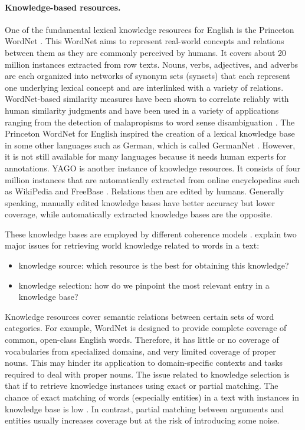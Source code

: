 \paragraph{Knowledge-based resources.}
One of the fundamental lexical knowledge resources for English is the Princeton WordNet \cite{fellbaum98}.  
This WordNet aims to represent real-world concepts and relations between them as they are commonly perceived by humans. 
It covers about 20 million instances extracted from row texts. 
Nouns, verbs, adjectives, and adverbs are each organized into networks of synonym sets (synsets) that each represent one underlying lexical concept and are interlinked with a variety of relations. 
WordNet-based similarity measures have been shown to correlate reliably with human similarity judgments and have been used in a variety of applications ranging from the detection of malapropisms to word sense disambiguation \cite{budanitsky06}.  
The Princeton WordNet for English inspired the creation of a lexical knowledge base in some other languages such as German, which is called GermanNet \cite{hamp97}. 
However, it is not still available for many languages because it needs human experts for annotations.  
YAGO \cite{hoffart13} is another instance of knowledge resources.  
It consists of four million instances that are automatically extracted from online encyclopedias such as WikiPedia \cite{denoyer06} and FreeBase \cite{bollacker08}. 
Relations then are edited by humans. 
Generally speaking, manually edited knowledge bases have better accuracy but lower coverage, while automatically extracted knowledge bases are the opposite. 

These knowledge bases are employed by different coherence models \cite{lapata05a,zhangmuyu15}. 
 explain two major issues for retrieving world knowledge related to words in a text: 
\begin{itemize}
\item knowledge source: which resource is the best for obtaining this knowledge? 
\item knowledge selection: how do we pinpoint the most relevant entry in a knowledge base?
\end{itemize}
Knowledge resources cover semantic relations between certain sets of word categories.  
For example, WordNet is designed to provide complete coverage of common, open-class English words. 
Therefore, it has little or no coverage of vocabularies from specialized domains, and very limited coverage of proper nouns. 
This may hinder its application to domain-specific contexts and tasks required to deal with proper nouns. 
The issue related to knowledge selection is that if to retrieve knowledge instances using exact or partial matching. 
The chance of exact matching of words (especially entities) in a text with instances in knowledge base is low \cite{zhangmuyu15}. 
In contrast, partial matching between arguments and entities usually increases coverage but at the risk of introducing some noise. 

